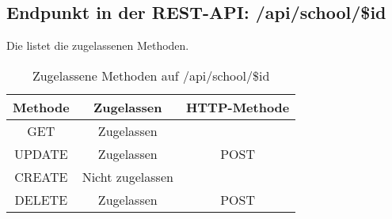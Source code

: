 \subsection{Endpunkt in der REST-API: /api/school/\$id}
Die  listet die zugelassenen Methoden. 

\begin{table}[!htbp]
	\begin{tabular}{|c|c|c|}
		\hline
			\textbf{Methode} & \textbf{Zugelassen} & \textbf{HTTP-Methode} \\ \hline
			GET & Zugelassen &  \\ \hline
			UPDATE & Zugelassen & POST \\ \hline 
			CREATE & Nicht zugelassen & \\ \hline 
			DELETE & Zugelassen & POST \\ \hline
	\end{tabular}

		\caption{Zugelassene Methoden auf /api/school/\$id}
		\label{tab:end:rest:api:school:id:meth}
\end{table}